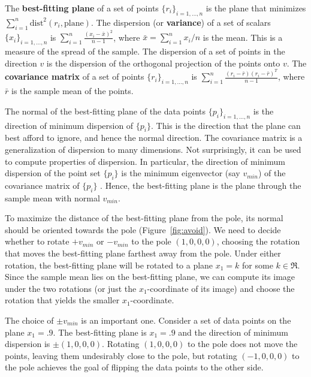 \begin{defn2}
The {\bf best-fitting plane} of a set of points $\{r_i\}_{i=1,\ldots,n}$
is the plane that minimizes $\sum_{i=1}^n \mbox{dist}^2 (r_i,\mbox{plane})$.
The dispersion (or {\bf variance}) of a set of scalars
$\{x_i\}_{i=1,\ldots,n}$ is $\sum_{i=1}^n \frac{(x_i -
\bar{x})^2}{n-1}$, where $\bar{x} = \sum_{i=1}^n x_i / n$ is the
mean.
This is a measure of the spread of the sample.
The dispersion of a set of points in the direction $v$ is the dispersion
of the orthogonal projection of the points onto $v$.
The {\bf covariance matrix} of a set of points $\{r_i\}_{i=1,\ldots,n}$ 
is $\sum_{i=1}^n \frac{(r_i - \bar{r})(r_i - \bar{r})^T}{n-1}$,
where $\bar{r}$ is the sample mean of the points.
\end{defn2}

The normal of the best-fitting plane of the data points $\{p_i\}_{i=1,\ldots,n}$
is the direction of minimum dispersion of $\{p_i\}$.
This is the direction that the plane can best afford to ignore,
and hence the normal direction.
The covariance matrix is a generalization of dispersion to many dimensions.
Not surprisingly, it can be used to compute properties of dispersion.
In particular, the direction of minimum dispersion of 
the point set $\{p_i\}$ is the minimum 
eigenvector (say $v_{min}$) of the covariance matrix of $\{p_i\}$ \cite{ballard82}.
Hence, the best-fitting plane is the plane through the sample mean
with normal $v_{min}$.

To maximize the distance of the best-fitting plane from the pole,
its normal should be oriented towards the pole (Figure~\ref{fig:avoid}).
We need to decide whether to rotate $+v_{min}$ or $-v_{min}$ to the pole
$(1,0,0,0)$, choosing the rotation that moves the best-fitting plane
farthest away from the pole.
Under either rotation, the best-fitting plane 
will be rotated to a plane $x_1 = k$ for some $k \in \Re$.
Since the sample mean lies on the best-fitting plane,
we can compute its image under the two rotations
(or just the $x_1$-coordinate of its image) 
and choose the rotation that yields the smaller $x_1$-coordinate.

\begin{example}
\label{eg:resolve}
The choice of $\pm v_{min}$ is an important one.
Consider a set of data points on the plane $x_1=.9$.
The best-fitting plane is $x_1=.9$
and the direction of minimum dispersion is $\pm(1,0,0,0)$.
Rotating $(1,0,0,0)$ to the pole does not move the points,
leaving them undesirably close to the pole,
but rotating $(-1,0,0,0)$ to the pole achieves the
goal of flipping the data points to the other side.
\end{example}

